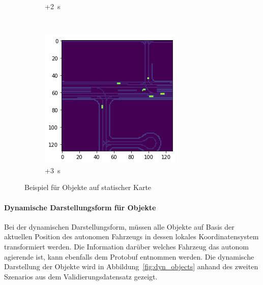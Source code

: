 \documentclass[12pt]{article}
\begin{document}
\begin{figure}[H]
\begin{subfigure}[b]{0.18\textwidth}
                \caption{+2~s}
            \end{subfigure}
            ~
            \begin{subfigure}[b]{0.18\textwidth}
                \includegraphics[width=\textwidth]{example_static_objects_40.png}
                \caption{+3~s}
            \end{subfigure}
            \caption{Beispiel für Objekte auf statischer Karte}\label{fig:stat_objects}
        \end{figure}

        \paragraph{Dynamische Darstellungsform für Objekte}
        Bei der dynamischen Darstellungsform, müssen alle Objekte auf Basis der aktuellen Position des autonomen Fahrzeugs 
        in dessen lokales Koordinatensystem transformiert werden. Die Information darüber welches Fahrzeug das autonom agierende ist, 
        kann ebenfalls dem Protobuf entnommen werden. Die dynamische Darstellung der Objekte wird in Abbildung~\ref{fig:dyn_objects} 
        anhand des zweiten Szenarios aus dem Validierungsdatensatz gezeigt.
        
\end{document}
